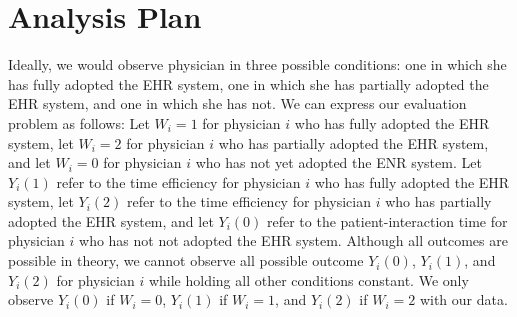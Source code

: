 \section{Analysis Plan}
Ideally, we would observe physician in three possible conditions: one in which she has fully adopted the EHR system, one in which she has partially adopted the EHR system, and one in which she has not. We can express our evaluation problem as follows: Let $W_i = 1$ for physician $i$ who has fully adopted the EHR system, let $W_i = 2$ for physician $i$ who has partially adopted the EHR system, and let $W_i = 0$ for physician $i$ who has not yet adopted the ENR system. Let $Y_i(1)$ refer to the time efficiency for physician $i$ who has fully adopted the EHR system, let $Y_i(2)$ refer to the time efficiency for physician $i$ who has partially adopted the EHR system, and let $Y_i(0)$ refer to the patient-interaction time for physician $i$ who has not not adopted the EHR system. Although all outcomes are possible in theory, we cannot observe all possible outcome $Y_i(0)$, $Y_i(1)$, and $Y_i(2)$ for physician $i$ while holding all other conditions constant. We only observe $Y_i(0)$ if $W_i = 0$, $Y_i(1)$ if $W_i = 1$, and $Y_i(2)$ if $W_i = 2$ with our data.  

